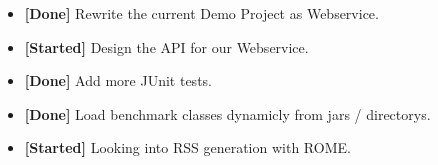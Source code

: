 \begin{itemize}
    \item \textbf{[Done]} Rewrite the current Demo Project as Webservice.
    \item \textbf{[Started]} Design the API for our Webservice.
    \item \textbf{[Done]} Add more JUnit tests.
    \item \textbf{[Done]} Load benchmark classes dynamicly from jars / directorys.
    \item \textbf{[Started]} Looking into RSS generation with ROME.
\end{itemize}
